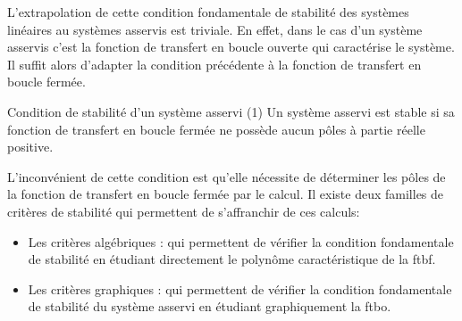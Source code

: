 %    
L'extrapolation de cette condition fondamentale de stabilité des systèmes 
linéaires au systèmes asservis est triviale. En effet, dans le cas d'un 
système asservis c'est la fonction de transfert en boucle ouverte qui 
caractérise le système. Il suffit alors d'adapter la condition précédente à la
fonction de transfert en boucle fermée.
\begin{criteria}{Condition de stabilité d'un système asservi (1)}
         Un système asservi est stable si sa fonction de transfert en 
         boucle fermée ne possède aucun pôles à partie réelle positive.
\end{criteria}
L'inconvénient de cette condition est qu'elle nécessite de déterminer les
pôles de la fonction de transfert en boucle fermée par le calcul. Il existe
deux familles de critères de stabilité qui permettent de s'affranchir de 
ces calculs:
\begin{itemize}
    \item Les critères algébriques : qui permettent de vérifier la condition 
        fondamentale de stabilité en étudiant directement le polynôme 
        caractéristique de la \gls{ftbf}.
    \item Les critères graphiques : qui permettent de vérifier la condition
        fondamentale de stabilité du système asservi en étudiant graphiquement
        la \gls{ftbo}.
\end{itemize}
\newpage
{}
\captionsetup{width=0.9\linewidth}

